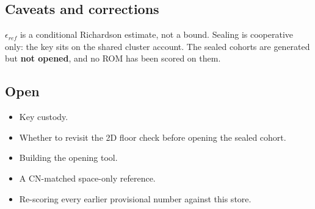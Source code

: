 \subsection*{Caveats and corrections}
$\epsilon_{ref}$ is a conditional Richardson estimate, not a bound. Sealing is cooperative only: the key sits on the shared cluster account. The sealed cohorts are generated but \textbf{not opened}, and no ROM has been scored on them.

\subsection*{Open}
\begin{itemize}
\item Key custody.
\item Whether to revisit the 2D floor check before opening the sealed cohort.
\item Building the opening tool.
\item A CN-matched space-only reference.
\item Re-scoring every earlier provisional number against this store.
\end{itemize}
